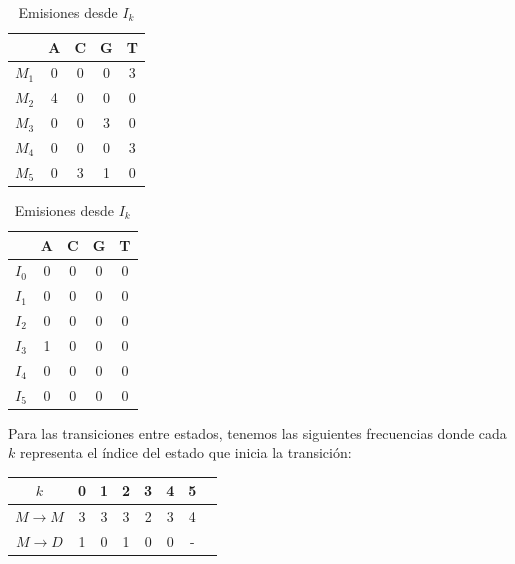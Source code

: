\begin{exampleth}
\begin{table}[H]
    \begin{minipage}{.5\linewidth}
        \centering
        \begin{tabular}{|c | C | C | C | C|}
             \hline
             & A & C & G & T \\
             \hline
             $M_1$ & 0 & 0 & 0 & 3 \\
             \hline
             $M_2$ & 4 & 0 & 0 & 0 \\
             \hline
             $M_3$ & 0 & 0 & 3 & 0 \\ 
             \hline
             $M_4$ & 0 & 0 & 0 & 3 \\
             \hline
             $M_5$ & 0 & 3 & 1 & 0 \\
             \hline
        \end{tabular}
        \caption{Emisiones desde $M_k$}
    \end{minipage}%
    \begin{minipage}{.5\linewidth}
        \centering
        \begin{tabular}{|c | C | C | C | C|}
            \hline
            & A & C & G & T \\
            \hline
            $I_0$ & 0 & 0 & 0 & 0 \\
            \hline
            $I_1$ & 0 & 0 & 0 & 0 \\
            \hline
            $I_2$ & 0 & 0 & 0 & 0 \\
            \hline
            $I_3$ & 1 & 0 & 0 & 0 \\ 
            \hline
            $I_4$ & 0 & 0 & 0 & 0 \\
            \hline
            $I_5$ & 0 & 0 & 0 & 0 \\
            \hline
        \end{tabular}
        \caption{Emisiones desde $I_k$}
    \end{minipage}
\end{table}
Para las transiciones entre estados, tenemos las siguientes frecuencias donde cada $k$ representa el índice del estado que inicia la transición:
\begin{table}[H]
    \centering
    \begin{tabular}{|c|C|C|C|C|C|C|C|}
        \hline
        $k$ & 0 & 1 & 2 & 3 & 4 & 5  \\
        \hline
        $M\rightarrow M$ & 3 & 3 & 3 & 2 & 3 & 4\\
        $M\rightarrow D$ & 1 & 0 & 1 & 0 & 0 & - \\

\end{tabular}
\end{table}
\end{exampleth}
